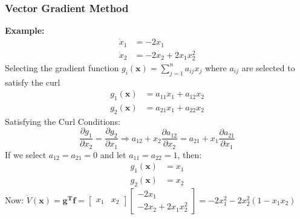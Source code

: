 \documentclass[11pt,handout]{beamer}   %
\begin{document}
\begin{frame}
\frametitle{Vector Gradient Method}
\small
\textbf{Example:}
\begin{equation*}
\begin{aligned}
\dot{x}_1 &= -2 x_1\\
\dot{x}_2 &= -2 x_2 + 2x_1 x_2 ^2
\end{aligned}
\end{equation*}
Selecting the gradient function $g_i(\mathbf{x}) = \sum_{j = 1}^{n} a_{ij} x_j$ where $a_{ij}$ are selected to satisfy the curl
\begin{equation*}
\begin{aligned}
g_1(\mathbf{x}) &= a_{11} x_1 + a_{12} x_2\\
g_2(\mathbf{x}) &= a_{21} x_1 + a_{22} x_2
\end{aligned}
\end{equation*}
Satisfying the Curl Conditions:
\begin{equation*}
\frac{\partial g_1}{\partial x_2} = \frac{\partial g_2}{\partial x_1} \Rightarrow a_{12} + x_2 \frac{\partial a_{12}}{\partial x_2} = a_{21} +  x_1 \frac{\partial a_{21}}{\partial x_1} 
\end{equation*}
If we select $a_{12} = a_{21} = 0$ and let $a_{11} = a_{22} = 1$, then:
\begin{equation*}
\begin{aligned}
g_1(\mathbf{x}) &= x_1\\
g_2(\mathbf{x}) &= x_2
\end{aligned}
\end{equation*}
Now: $\dot{V}(\mathbf{x}) = \mathbf{g^T f} = \begin{bmatrix}
x_1 & x_2
\end{bmatrix}
\begin{bmatrix}
-2 x_1 \\ -2 x_2 + 2 x_1 x_2^2
\end{bmatrix} = -2x_1^2 - 2x_2^2 (1-x_1x_2)$
\end{frame}
\end{document}
